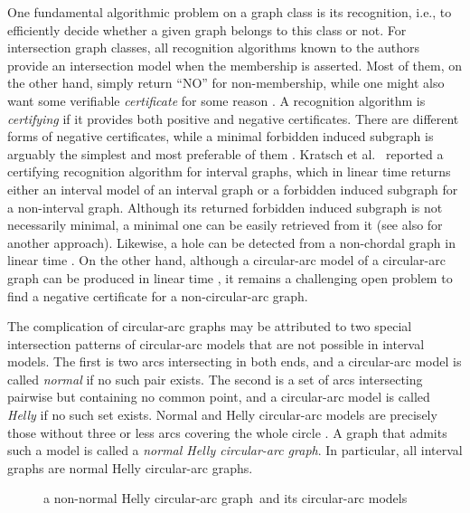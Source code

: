 \documentclass[10pt]{article}
\newcommand{\nhcag}{normal Helly circular-arc graph}
\begin{document}
One fundamental algorithmic problem on a graph class is its
recognition, i.e., to efficiently decide whether a given graph belongs
to this class or not.  For intersection graph classes, all
{recognition algorithms} known to the authors provide an intersection
model when the membership is asserted.  Most of them, on the other
hand, simply return ``NO'' for non-membership, while one might also
want some verifiable \emph{certificate} for some reason
\cite{mcconnell-11-survey-certifying-algorithms}.  A recognition
algorithm is \emph{certifying} if it provides both positive and
negative certificates.  There are different forms of negative
certificates, while a minimal forbidden induced subgraph is arguably
the simplest and most preferable of them
\cite{heggernes-07-certifying-fis}.  Kratsch et
al.~\cite{kratsch-06-certifying-interval-and-permutation} reported a
certifying recognition algorithm for interval graphs, which in linear
time returns either an interval model of an interval graph or a
forbidden induced subgraph for a non-interval graph.  Although its
returned forbidden induced subgraph is not necessarily minimal, a
minimal one can be easily retrieved from it (see also
\cite{lindzey-13-find-forbidden-subgraphs} for another approach).
Likewise, a hole can be detected from a non-chordal graph in linear
time \cite{tarjan-84-chordal-recognition}.  On the other hand,
although a circular-arc model of a circular-arc graph can be produced
in linear time \cite{mcconnell-03-recognition-cag}, it remains a
challenging open problem to find a negative certificate for a
non-circular-arc graph.

The complication of circular-arc graphs may be attributed to two
special intersection patterns of circular-arc models that are not
possible in interval models.  The first is two arcs intersecting in
both ends, and a {circular-arc model} is called \emph{normal} if no
such pair exists.  The second is a set of arcs intersecting pairwise
but containing no common point, and a {circular-arc model} is called
\emph{Helly} if no such set exists.  Normal and Helly circular-arc
models are precisely those without three or less arcs covering the
whole circle
\cite{mckee-03-restricted-cag,lin-13-nhcag-and-subclasses}.  A graph
that admits such a model is called a \emph{normal Helly circular-arc
  graph}.  In particular, all interval graphs are normal Helly
circular-arc graphs.  

\begin{figure}[h!]
  \centering
  \qquad
  \qquad
  \caption{a non-\nhcag\ and its circular-arc models}
  \label{fig:normal-and-helly}
\end{figure}
\end{document}

